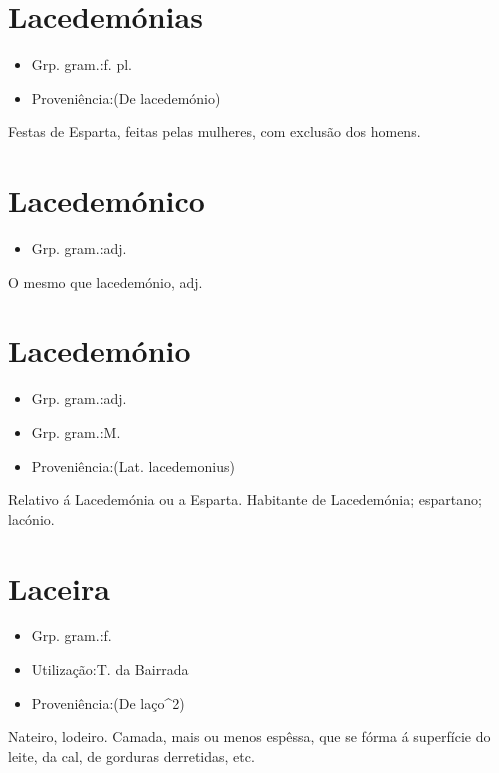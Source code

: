 \section{Lacedemónias}
\begin{itemize}
\item {Grp. gram.:f. pl.}
\end{itemize}
\begin{itemize}
\item {Proveniência:(De \textunderscore lacedemónio\textunderscore )}
\end{itemize}
Festas de Esparta, feitas pelas mulheres, com exclusão dos homens.
\section{Lacedemónico}
\begin{itemize}
\item {Grp. gram.:adj.}
\end{itemize}
O mesmo que \textunderscore lacedemónio\textunderscore , adj.
\section{Lacedemónio}
\begin{itemize}
\item {Grp. gram.:adj.}
\end{itemize}
\begin{itemize}
\item {Grp. gram.:M.}
\end{itemize}
\begin{itemize}
\item {Proveniência:(Lat. \textunderscore lacedemonius\textunderscore )}
\end{itemize}
Relativo á Lacedemónia ou a Esparta.
Habitante de Lacedemónia; espartano; lacónio.
\section{Laceira}
\begin{itemize}
\item {Grp. gram.:f.}
\end{itemize}
\begin{itemize}
\item {Utilização:T. da Bairrada}
\end{itemize}
\begin{itemize}
\item {Proveniência:(De \textunderscore laço\textunderscore ^2)}
\end{itemize}
Nateiro, lodeiro.
Camada, mais ou menos espêssa, que se fórma á superfície do leite, da cal, de gorduras derretidas, etc.
